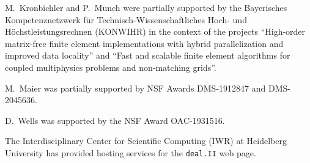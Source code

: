 \documentclass{ansarticle-preprint}
\newcommand{\specialword}[1]{\texttt{#1}}
\newcommand{\dealii}{{\specialword{deal.II}}\xspace}
\begin{document}
M.~Kronbichler and P.~Munch were partially supported by the
Bayerisches Kompetenznetzwerk
f\"ur Technisch-Wissen\-schaft\-li\-ches Hoch- und H\"ochstleistungsrechnen
(KONWIHR) in the context of the projects
``High-order matrix-free finite element implementations with
hybrid parallelization and improved data locality'' and ``Fast and scalable finite element algorithms for coupled multiphysics problems and non-matching grids''.

M.~Maier was partially supported by NSF Awards DMS-1912847 and DMS-2045636.

D.~Wells was supported by the NSF Award OAC-1931516.

The Interdisciplinary Center for Scientific Computing (IWR) at Heidelberg
University has provided hosting services for the \dealii web page.

{}

\end{document}

